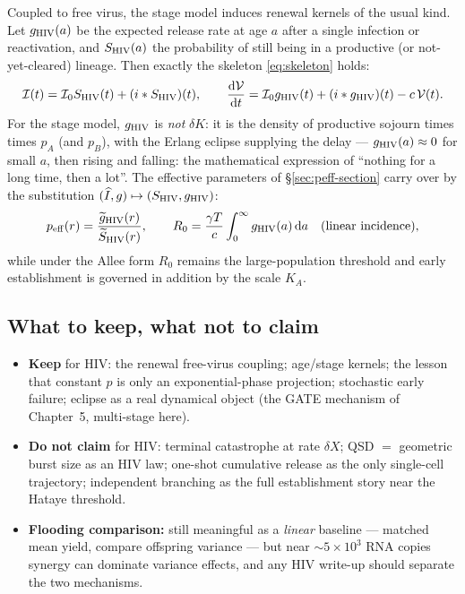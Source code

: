 Coupled to free virus, the stage model induces renewal kernels of the usual
kind. Let $g_{\rm HIV}(a)$ be the expected release rate at age $a$ after a
single infection or reactivation, and $S_{\rm HIV}(a)$ the probability of
still being in a productive (or not-yet-cleared) lineage. Then exactly the
skeleton \eqref{eq:skeleton} holds:
\begin{equation}
\mathcal{I}(t)=\mathcal{I}_0S_{\rm HIV}(t)+(i*S_{\rm HIV})(t),
\qquad
\displaystyle\frac{{\rm d} \mathcal{V}}{{\rm d} t}=\mathcal{I}_0g_{\rm HIV}(t)+(i*g_{\rm HIV})(t)-c\,\mathcal{V}(t).
\end{equation}
For the stage model, $g_{\rm HIV}$ is \emph{not} $\delta K$: it is the
density of productive sojourn times times $p_A$ (and $p_B$), with the
Erlang eclipse supplying the delay --- $g_{\rm HIV}(a)\approx0$ for small
$a$, then rising and falling: the mathematical expression of ``nothing for
a long time, then a lot''. The effective parameters of
\S\ref{sec:peff-section} carry over by the substitution
$(\widehat{I},g)\mapsto(S_{\rm HIV},g_{\rm HIV})$:
\begin{equation}
p_{\rm eff}(r)=\frac{\widetilde{g}_{\rm HIV}(r)}{\widetilde{S}_{\rm HIV}(r)},
\qquad
R_0=\frac{\gamma T}{c}\int_0^\infty g_{\rm HIV}(a)\,{\rm d} a
\quad\text{(linear incidence)},
\end{equation}
while under the Allee form $R_0$ remains the large-population threshold and
early establishment is governed in addition by the scale $K_A$.

\subsection{What to keep, what not to claim}

\begin{itemize}
\item \textbf{Keep} for HIV: the renewal free-virus coupling; age/stage
kernels; the lesson that constant $p$ is only an exponential-phase
projection; stochastic early failure; eclipse as a real dynamical object
(the GATE mechanism of Chapter~5, multi-stage here).
\item \textbf{Do not claim} for HIV: terminal catastrophe at rate
$\delta X$; QSD $=$ geometric burst size as an HIV law; one-shot
cumulative release as the only single-cell trajectory; independent
branching as the full establishment story near the Hataye threshold.
\item \textbf{Flooding comparison:} still meaningful as a \emph{linear}
baseline --- matched mean yield, compare offspring variance --- but near
$\sim5\times10^3$ RNA copies synergy can dominate variance effects, and any
HIV write-up should separate the two mechanisms.
\end{itemize}

